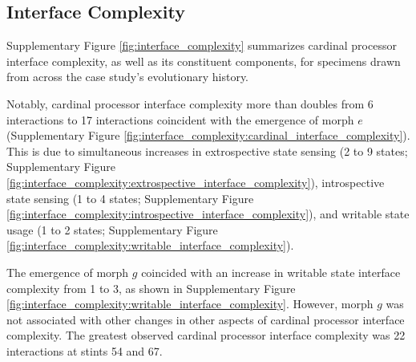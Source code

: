 


\subsection{Interface Complexity}

Supplementary Figure \ref{fig:interface_complexity} summarizes cardinal processor interface complexity, as well as its constituent components, for specimens drawn from across the case study's evolutionary history.

Notably, cardinal processor interface complexity more than doubles from 6 interactions to 17 interactions coincident with the emergence of morph $e$ (Supplementary Figure \ref{fig:interface_complexity:cardinal_interface_complexity}).
This is due to simultaneous increases in extrospective state sensing (2 to 9 states; Supplementary Figure \ref{fig:interface_complexity:extrospective_interface_complexity}), introspective state sensing (1 to 4 states; Supplementary Figure \ref{fig:interface_complexity:introspective_interface_complexity}), and writable state usage (1 to 2 states; Supplementary Figure \ref{fig:interface_complexity:writable_interface_complexity}).

The emergence of morph $g$ coincided with an increase in writable state interface complexity from 1 to 3, as shown in Supplementary Figure \ref{fig:interface_complexity:writable_interface_complexity}.
However, morph $g$ was not associated with other changes in other aspects of cardinal processor interface complexity.
The greatest observed cardinal processor interface complexity was 22 interactions at stints 54 and 67.

